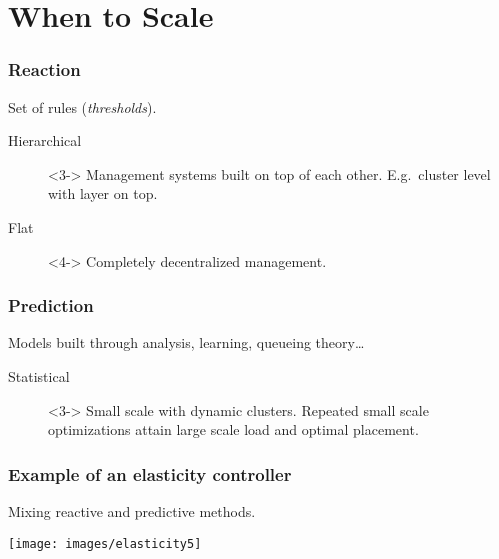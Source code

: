 \documentclass{beamer}
\begin{document}
\section{When to Scale}
\begin{frame}
  \frametitle{Reaction~\cite{gulati2011cloud}}
  \begin{center}
    Set of rules (\textit{thresholds}).
  \end{center}

  \vspace*{\fill}

  \begin{description}
    \item[Hierarchical]<3-> Management systems built on top of each other. E.g.\ cluster level with layer on top.
    \item[Flat]<4-> Completely decentralized management.
  \end{description}

  \vspace*{\fill}
\end{frame}

\begin{frame}
  \frametitle{Prediction~\cite{gulati2011cloud}}
  \begin{center}
    Models built through analysis, learning, queueing theory\dots
  \end{center}

  \vspace*{\fill}

  \begin{description}
    \item[Statistical]<3-> Small scale with dynamic clusters. Repeated small scale optimizations attain large scale load and optimal placement.
  \end{description}

  \vspace*{\fill}
\end{frame}

\begin{frame}
  \frametitle{Example of an elasticity controller~\cite{moore2013coordinated}}
  \begin{center}
    Mixing reactive and predictive methods.
  \end{center}
  \pause{}
  \texttt{[image: images/elasticity5]}
\end{frame}
\end{document}
